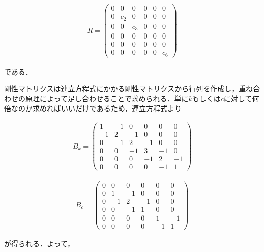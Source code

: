 \begin{eqnarray}
    R = 
    \left(\begin{matrix}
        0   & 0   & 0   & 0   & 0   & 0   \\
        0   & c_2 & 0   & 0   & 0   & 0   \\
        0   & 0   & c_3 & 0   & 0   & 0   \\
        0   & 0   & 0   & 0   & 0   & 0   \\
        0   & 0   & 0   & 0   & 0   & 0   \\
        0   & 0   & 0   & 0   & 0   & c_6 
    \end{matrix}\right)
\end{eqnarray}

である．

剛性マトリクスは連立方程式にかかる剛性マトリクスから行列を作成し，重ね合わせの原理によって足し合わせることで求められる．単に$k$もしくは$c$に対して何倍なのか求めればいいだけであるため，連立方程式より

\begin{eqnarray}
    B_k = 
    \left(\begin{matrix}
        1   & -1  & 0   & 0   & 0  & 0  \\
        -1  & 2   & -1  & 0   & 0  & 0  \\
        0   & -1  & 2   & -1  & 0  & 0  \\
        0   & 0   & -1  & 3   & -1 & 0  \\
        0   & 0   & 0   & -1  & 2  & -1 \\
        0   & 0   & 0   & 0   & -1 & 1  
    \end{matrix}\right)
\end{eqnarray}

\begin{eqnarray}
    B_c = 
    \left(\begin{matrix}
        0   & 0   & 0   & 0   & 0  & 0  \\
        0   & 1   & -1  & 0   & 0  & 0  \\
        0   & -1  & 2   & -1  & 0  & 0  \\
        0   & 0   & -1  & 1   & 0  & 0  \\
        0   & 0   & 0   & 0   & 1  & -1 \\
        0   & 0   & 0   & 0   & -1 & 1  
    \end{matrix}\right)
\end{eqnarray}

が得られる．よって，

